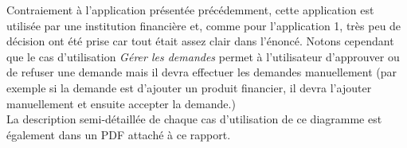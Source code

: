 Contraiement à l'application présentée précédemment, cette application est utilisée par une institution financière et, comme pour l'application 1, très peu de décision ont été prise car tout était assez clair dans l'énoncé.
Notons cependant que le cas d'utilisation \textit{Gérer les demandes} permet à l'utilisateur d'approuver ou de refuser une demande mais il devra effectuer les demandes manuellement
(par exemple si la demande est d'ajouter un produit financier, il devra l'ajouter manuellement et ensuite accepter la demande.)\\
La description semi-détaillée de chaque cas d'utilisation de ce diagramme est également dans un PDF attaché à ce rapport.

